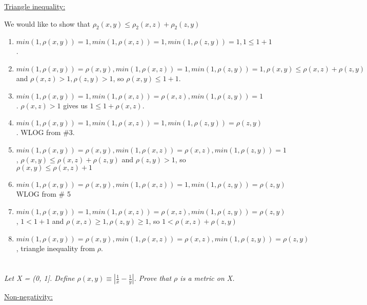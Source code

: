 \documentclass[]{article}
\begin{document}
			\underline{Triangle inequality:}


				We would like to show that $\rho_2(x, y) \leq \rho_2(x, z) + \rho_2(z, y)$

				\begin{enumerate}
					\item $min(1, \rho(x, y)) = 1, min(1, \rho(x, z)) = 1, min(1, \rho(z, y)) = 1, 1 \leq 1 + 1$. 

					\item $min(1, \rho(x, y)) = \rho(x, y), min(1, \rho(x, z)) = 1, min(1, \rho(z, y)) = 1, \rho(x, y) \leq \rho(x, z) + \rho(z, y)$ and $\rho(x, z) > 1, \rho(z, y) > 1$, so $\rho(x, y) \leq 1 + 1$. 

					\item $min(1, \rho(x, y)) = 1, min(1, \rho(x, z)) = \rho(x, z), min(1, \rho(z, y)) = 1$. $\rho(x, z) > 1$ gives us $1 \leq 1 + \rho(x, z)$.

					\item $min(1, \rho(x, y)) = 1, min(1, \rho(x, z)) = 1, min(1, \rho(z, y)) = \rho(z, y)$. WLOG from \#3.

					\item $min(1, \rho(x, y)) = \rho(x, y), min(1, \rho(x, z)) = \rho(x, z), min(1, \rho(z, y)) = 1$, $\rho(x, y) \leq \rho(x, z) + \rho(z, y)$ and $\rho(z, y) > 1$, so $\rho(x, y) \leq \rho(x, z) + 1$ 

					\item $min(1, \rho(x, y)) = \rho(x, y), min(1, \rho(x, z)) = 1, min(1, \rho(z, y)) = \rho(z, y)$ WLOG from \# 5

					\item $min(1, \rho(x, y)) = 1, min(1, \rho(x, z)) = \rho(x, z), min(1, \rho(z, y)) = \rho(z, y)$, $1 < 1 + 1$ and $\rho(x, z) \geq 1, \rho(z, y) \geq 1$, so $1 < \rho(x, z) + \rho(z, y) $

					\item $min(1, \rho(x, y)) = \rho(x, y), min(1, \rho(x, z)) = \rho(x, z), min(1, \rho(z, y)) = \rho(z, y)$, triangle inequality from $\rho$. 
				\end{enumerate}

	\section{}
		\textit{Let X = (0, 1]. Define $\rho(x, y) \equiv \left | \frac{1}{x} - \frac{1}{y} \right |$. Prove that $\rho$ is a metric on X.}

			\underline{Non-negativity:}
\end{document}
